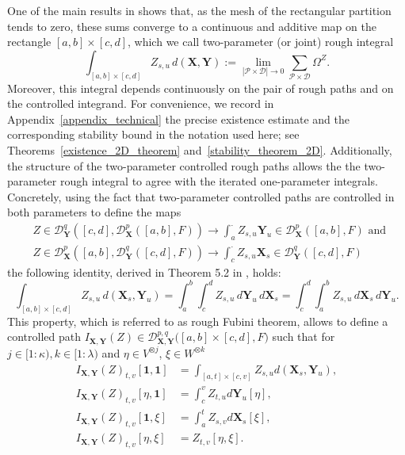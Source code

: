 \documentclass{article}%
\begin{document}
One of the main results in \cite{cass2023fubini} shows that, as the mesh of the rectangular partition tends to zero, these sums converge to a continuous and additive map on the rectangle $[a,b] \times [c,d]$, which we call two-parameter (or joint) rough integral
\[
\int_{[a,b] \times [c,d]} Z_{s, u} \, d(\mathbf{X}, \mathbf{Y})  
   :=  \lim_{\left|\mathcal{P} \times \mathcal{D}\right| \to 0} 
   \sum_{\mathcal{P}\times \mathcal{D}} \Omega^Z.
\]
Moreover, this integral depends continuously on the pair of rough paths and on the controlled integrand. For convenience, we record in Appendix~\ref{appendix_technical} the precise existence estimate and the corresponding stability bound in the notation used here; see Theorems~\ref{existence_2D_theorem} and~\ref{stability_theorem_2D}.
Additionally, the structure of the two-parameter controlled rough paths allows the the two-parameter rough integral to agree with the iterated one-parameter integrals. Concretely,
using the fact that two-parameter controlled paths are controlled in both parameters to define the maps 
\begin{align*}
&Z \in \mathcal{D}^q_{\mathbf{Y}}([c,d], \mathcal{D}^p_{\mathbf{X}}([a,b], F)) \to \int_a^\cdot Z_{s,u} \mathbf{Y}_u \in \mathcal{D}^p_{\mathbf{X}}([a,b], F) \text{ and } \\
&Z \in \mathcal{D}^p_{\mathbf{X}}([a,b], \mathcal{D}^q_{\mathbf{Y}}([c,d], F)) \to \int_c^\cdot Z_{s,u} \mathbf{X}_s \in \mathcal{D}^q_{\mathbf{Y}}([c,d], F)
\end{align*}
the following identity, derived in Theorem 5.2 in \cite{cass2023fubini}, holds:
\[
\int_{[a,b] \times [c,d]} Z_{s, u} \, d(\mathbf{X}_s, \mathbf{Y}_u)  
= \int_{a}^b \int_{c}^d Z_{s, u} \, d\mathbf{Y}_u \, d\mathbf{X}_s 
= \int_c^d \int_a^b Z_{s, u} \, d\mathbf{X}_s \, d\mathbf{Y}_u.
\]
This property, which is referred to as rough Fubini theorem, allows to define a controlled path  $I_{\mathbf{X}, \mathbf{Y}}(Z) \in \mathcal{D}^{p, q}_{\mathbf{X}, \mathbf{Y}}\big([a, b] \times [c,d],  F\big)$ such that  for $j \in [1:\kappa), k\in [1:\lambda)$ and $\eta \in V^{\otimes j}$, $\xi \in W^{\otimes k}$
\begin{equation}\label{definition_I_X_Y}
\begin{aligned}
    I_{\mathbf{X}, \mathbf{Y}}(Z)_{t,v}[\mathbf{1}, \mathbf{1}] &=  \int_{[a,t] \times [c, v]} Z_{s,u} d(\mathbf{X}_s, \mathbf{Y}_u),\\
    I_{\mathbf{X}, \mathbf{Y}}(Z)_{t,v} [\eta,  \mathbf{1}] &= \int_c^v Z_{t,u} d\mathbf{Y}_u [\eta],  \\
    I_{\mathbf{X}, \mathbf{Y}}(Z)_{t,v} [ \mathbf{1}, \xi] &= \int_a^t Z_{s,v} d\mathbf{X}_s [\xi],\\
    I_{\mathbf{X}, \mathbf{Y}}(Z)_{t,v} [\eta, \xi] &=  Z_{t,v} [\eta, \xi].
\end{aligned}
\end{equation}
\end{document}
